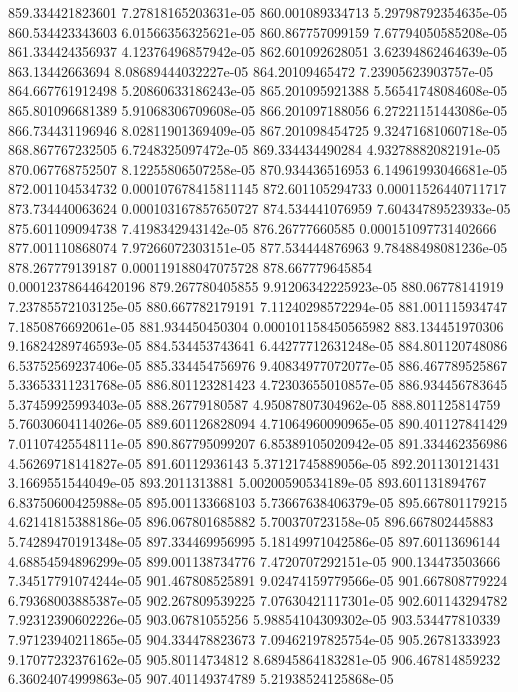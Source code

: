 {859.334421823601 7.27818165203631e-05
860.001089334713 5.29798792354635e-05
860.534423343603 6.01566356325621e-05
860.867757099159 7.67794050585208e-05
861.334424356937 4.12376496857942e-05
862.601092628051 3.62394862464639e-05
863.13442663694 8.08689444032227e-05
864.20109465472 7.23905623903757e-05
864.667761912498 5.20860633186243e-05
865.201095921388 5.56541748084608e-05
865.801096681389 5.91068306709608e-05
866.201097188056 6.27221151443086e-05
866.734431196946 8.02811901369409e-05
867.201098454725 9.32471681060718e-05
868.867767232505 6.7248325097472e-05
869.334434490284 4.93278882082191e-05
870.067768752507 8.12255806507258e-05
870.934436516953 6.14961993046681e-05
872.001104534732 0.000107678415811145
872.601105294733 0.00011526440711717
873.734440063624 0.000103167857650727
874.534441076959 7.60434789523933e-05
875.601109094738 7.4198342943142e-05
876.26777660585 0.000151097731402666
877.001110868074 7.97266072303151e-05
877.534444876963 9.78488498081236e-05
878.267779139187 0.000119188047075728
878.667779645854 0.000123786446420196
879.267780405855 9.91206342225923e-05
880.06778141919 7.23785572103125e-05
880.667782179191 7.11240298572294e-05
881.001115934747 7.1850876692061e-05
881.934450450304 0.000101158450565982
883.134451970306 9.16824289746593e-05
884.534453743641 6.44277712631248e-05
884.801120748086 6.53752569237406e-05
885.334454756976 9.40834977072077e-05
886.467789525867 5.33653311231768e-05
886.801123281423 4.72303655010857e-05
886.934456783645 5.37459925993403e-05
888.26779180587 4.95087807304962e-05
888.801125814759 5.76030604114026e-05
889.601126828094 4.71064960090965e-05
890.401127841429 7.01107425548111e-05
890.867795099207 6.85389105020942e-05
891.334462356986 4.56269718141827e-05
891.60112936143 5.37121745889056e-05
892.201130121431 3.1669551544049e-05
893.2011313881 5.00200590534189e-05
893.601131894767 6.83750600425988e-05
895.001133668103 5.73667638406379e-05
895.667801179215 4.62141815388186e-05
896.067801685882 5.700370723158e-05
896.667802445883 5.74289470191348e-05
897.334469956995 5.18149971042586e-05
897.60113696144 4.68854594896299e-05
899.001138734776 7.4720707292151e-05
900.134473503666 7.34517791074244e-05
901.467808525891 9.02474159779566e-05
901.667808779224 6.79368003885387e-05
902.267809539225 7.07630421117301e-05
902.601143294782 7.92312390602226e-05
903.06781055256 5.98854104309302e-05
903.534477810339 7.97123940211865e-05
904.334478823673 7.09462197825754e-05
905.26781333923 9.17077232376162e-05
905.80114734812 8.68945864183281e-05
906.467814859232 6.36024074999863e-05
907.401149374789 5.21938524125868e-05
}
